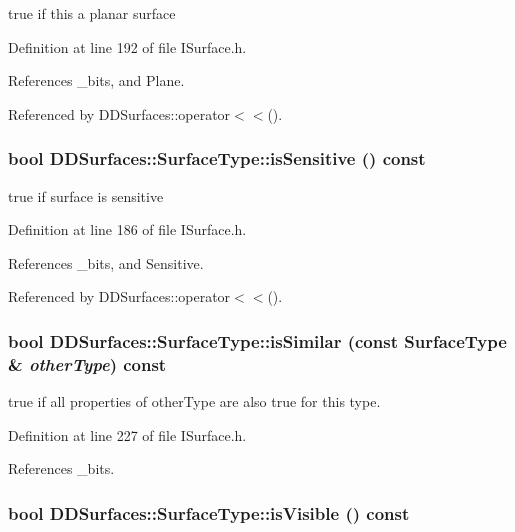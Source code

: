 true if this a planar surface 

Definition at line 192 of file ISurface.h.

References \_\-bits, and Plane.

Referenced by DDSurfaces::operator$<$$<$().\hypertarget{class_d_d_surfaces_1_1_surface_type_a406663d411a53cb361b6aaca88c93b48}{
\subsubsection[{isSensitive}]{\setlength{\rightskip}{0pt plus 5cm}bool DDSurfaces::SurfaceType::isSensitive () const}}
\label{class_d_d_surfaces_1_1_surface_type_a406663d411a53cb361b6aaca88c93b48}


true if surface is sensitive 

Definition at line 186 of file ISurface.h.

References \_\-bits, and Sensitive.

Referenced by DDSurfaces::operator$<$$<$().\hypertarget{class_d_d_surfaces_1_1_surface_type_a5c092596364989469d82af1268cea284}{
\subsubsection[{isSimilar}]{\setlength{\rightskip}{0pt plus 5cm}bool DDSurfaces::SurfaceType::isSimilar (const {\bf SurfaceType} \& {\em otherType}) const}}
\label{class_d_d_surfaces_1_1_surface_type_a5c092596364989469d82af1268cea284}


true if all properties of otherType are also true for this type. 

Definition at line 227 of file ISurface.h.

References \_\-bits.\hypertarget{class_d_d_surfaces_1_1_surface_type_aa20ae135ab952b6501e9d93aacc5125d}{
\subsubsection[{isVisible}]{\setlength{\rightskip}{0pt plus 5cm}bool DDSurfaces::SurfaceType::isVisible () const}}
\label{class_d_d_surfaces_1_1_surface_type_aa20ae135ab952b6501e9d93aacc5125d}


